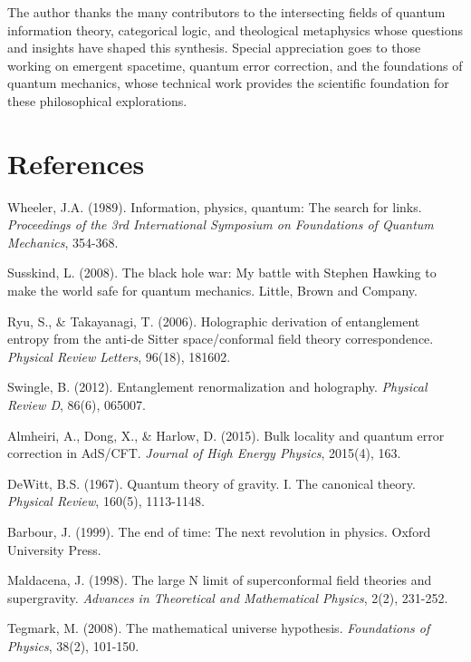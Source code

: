 \documentclass[12pt]{article}
\begin{document}
The author thanks the many contributors to the intersecting fields of quantum information theory, categorical logic, and theological metaphysics whose questions and insights have shaped this synthesis. Special appreciation goes to those working on emergent spacetime, quantum error correction, and the foundations of quantum mechanics, whose technical work provides the scientific foundation for these philosophical explorations.

\section*{References}

\begin{thebibliography}{99}

Wheeler, J.A. (1989). Information, physics, quantum: The search for links. \emph{Proceedings of the 3rd International Symposium on Foundations of Quantum Mechanics}, 354-368.

Susskind, L. (2008). The black hole war: My battle with Stephen Hawking to make the world safe for quantum mechanics. Little, Brown and Company.

Ryu, S., \& Takayanagi, T. (2006). Holographic derivation of entanglement entropy from the anti-de Sitter space/conformal field theory correspondence. \emph{Physical Review Letters}, 96(18), 181602.

Swingle, B. (2012). Entanglement renormalization and holography. \emph{Physical Review D}, 86(6), 065007.

Almheiri, A., Dong, X., \& Harlow, D. (2015). Bulk locality and quantum error correction in AdS/CFT. \emph{Journal of High Energy Physics}, 2015(4), 163.

DeWitt, B.S. (1967). Quantum theory of gravity. I. The canonical theory. \emph{Physical Review}, 160(5), 1113-1148.

Barbour, J. (1999). The end of time: The next revolution in physics. Oxford University Press.

Maldacena, J. (1998). The large N limit of superconformal field theories and supergravity. \emph{Advances in Theoretical and Mathematical Physics}, 2(2), 231-252.

Tegmark, M. (2008). The mathematical universe hypothesis. \emph{Foundations of Physics}, 38(2), 101-150.


\end{thebibliography}
\end{document}
